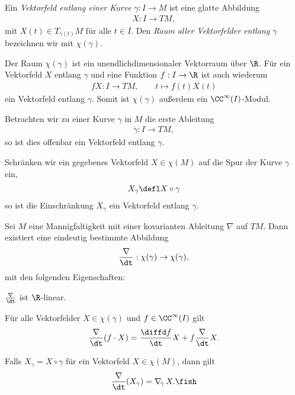 \documentclass[%
	paper=a5,%
	fleqn,%
	DIV=18,%
	BCOR=0mm,
	fontsize=11pt,
	titlepage=false,%
	bibliography=totoc,
	DIV=18,%
	twoside=true,
	pdftitle=Riemannsche Geometrie,
	pdfauthor=Uwe Semmelmann,
	numbers=noendperiod]%
	{scrbook}
\begin{document}
\begin{defn}
Ein \emph{Vektorfeld entlang einer Kurve}  $\gamma: I\to M$ ist eine glatte
Abbildung
\begin{align*}
X: I\to TM,
\end{align*}
mit $X(t)\in T_{\gamma(t)}M$ für alle $t\in I$. Den \emph{Raum aller
Vektorfelder entlang $\gamma$} bezeichnen wir mit $\chi(\gamma)$.\fish
\end{defn}

\begin{rem}
Der Raum $\chi(\gamma)$ ist ein unendlichdimensionaler Vektorraum über $\R$. Für
ein Vektorfeld $X$ entlang $\gamma$ und eine Funktion $f: I\to \R$ ist auch
wiederum
\begin{align*}
fX : I\to TM,\qquad t\mapsto f(t)X(t)
\end{align*}
ein Vektorfeld entlang $\gamma$. Somit ist $\chi(\gamma)$ außerdem ein
$\CC^\infty(I)$-Modul.\map
\end{rem}

\begin{ex}
\begin{exenum}
\item Betrachten wir zu einer Kurve $\gamma$ in $M$ die erste Ableitung
\begin{align*}
\dot{\gamma}: I\to TM,
\end{align*} 
so ist dies offenbar ein Vektorfeld entlang $\gamma$.
\item Schränken wir ein gegebenes Vektorfeld $X\in\chi(M)$ auf die Spur der
Kurve $\gamma$ ein,
\begin{align*}
X_\gamma \defl X\circ \gamma 
\end{align*}
so ist die Einschränkung $X_\gamma$ ein Vektorfeld entlang $\gamma$.\bsp
\end{exenum}
\end{ex}

\begin{prop}
Sei $M$ eine Mannigfaltigkeit mit einer kovarianten Ableitung $\nabla$ auf $TM$.
Dann existiert eine eindeutig bestimmte Abbildung
\begin{align*}
\frac{\nabla}{\dt} : \chi(\gamma)\to \chi(\gamma),
\end{align*}
mit den folgenden Eigenschaften:
\begin{propenum}
\item $\frac{\nabla}{\dt}$ ist $\R$-linear.
\item Für alle Vektorfelder $X\in\chi(\gamma)$ und $f\in\CC^\infty(I)$ gilt
\begin{align*}
\frac{\nabla}{\dt}(f\cdot X) = \frac{\diffd f}{\dt}X + f \frac{\nabla}{\dt}X.
\end{align*}
\item Falls $X_\gamma = X\circ \gamma$ für ein Vektorfeld $X\in\chi(M)$, dann
gilt
\begin{align*}
\frac{\nabla}{\dt}(X_\gamma) = \nabla_{\!\dot{\gamma}}\,X.\fish
\end{align*}
\end{propenum}
\end{prop}
\end{document}
